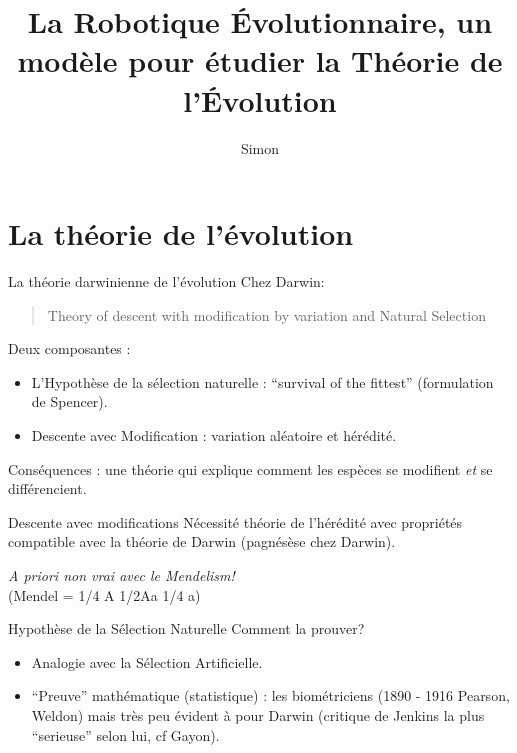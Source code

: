 \documentclass[8pt]{beamer}
\author{Simon}
\title{La Robotique \'Evolutionnaire, un modèle pour étudier la Théorie de l'\'Evolution}
\begin{document}
\begin{frame}
	\titlepage
\end{frame}

\section{La théorie de l'évolution}
\begin{frame}{La théorie darwinienne de l'évolution}
	Chez Darwin:
	\begin{quote}
		Theory of descent with modification by variation and Natural Selection
	\end{quote}

	\vfill

	Deux composantes :
	\begin{itemize}
		\item L'Hypothèse de la sélection naturelle : ``survival of the fittest'' (formulation de Spencer).
		\item Descente avec Modification : variation aléatoire et hérédité.
	\end{itemize}
	Conséquences : une théorie qui explique comment les espèces se modifient \emph{et} se différencient.
\end{frame}

\begin{frame}{Descente avec modifications}
	Nécessité théorie de l'hérédité avec propriétés compatible avec la théorie de Darwin (pagnésèse chez Darwin).
	\newline
	\begin{center}
		\emph{A priori non vrai avec le Mendelism!}\\
		(Mendel = 1/4 A 1/2Aa 1/4 a)
	\end{center}
\end{frame}
\begin{frame}{Hypothèse de la Sélection Naturelle}
	Comment la prouver? 

	
	\begin{itemize}
		\item Analogie avec la Sélection Artificielle.
		\item ``Preuve'' mathématique (statistique) : les biométriciens (1890 - 1916 Pearson, Weldon) mais très peu évident à pour Darwin (critique de Jenkins la plus ``serieuse'' selon lui, cf Gayon).
	\end{itemize}


\end{frame}
\end{document}
